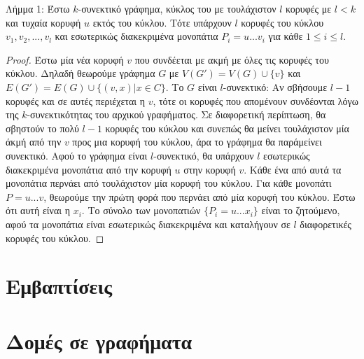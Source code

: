 \documentclass[a4paper, oneside, 11pt]{article}
\begin{document}
\begin{enumerate}
Λήμμα 1: Έστω $k$-συνεκτικό γράφημα, κύκλος του με τουλάχιστον $l$ κορυφές με $l<k$ και τυχαία κορυφή $u$ εκτός του κύκλου. Τότε υπάρχουν $l$ κορυφές του κύκλου $v_1, v_2, ..., v_l$ και 
εσωτερικώς διακεκριμένα μονοπάτια $P_i = u...v_i$ για κάθε $1\leq i\leq l$.
\begin{proof}
Έστω μία νέα κορυφή $v$ που συνδέεται με ακμή με όλες τις κορυφές του κύκλου. Δηλαδή θεωρούμε γράφημα $G$ με $V(G')=V(G)\cup \{v\}$ και $E(G')=E(G)\cup \{(v,x)|x\in C\}$. Το $G$ είναι $l$-συνεκτικό:
Αν σβήσουμε $l-1$ κορυφές και σε αυτές περιέχεται η $v$, τότε οι κορυφές που απομένουν συνδέονται λόγω της $k$-συνεκτικότητας του αρχικού γραφήματος. Σε διαφορετική περίπτωση, θα σβηστούν το πολύ $l-1$
κορυφές του κύκλου και συνεπώς θα μείνει τουλάχιστον μία άκμή από την $v$ προς μια κορυφή του κύκλου, άρα το γράφημα θα παράμείνει συνεκτικό. Αφού το γράφημα είναι $l$-συνεκτικό, θα υπάρχουν $l$ εσωτερικώς
διακεκριμένα μονοπάτια από την κορυφή $u$ στην κορυφή $v$. Κάθε ένα από αυτά τα μονοπάτια περνάει από τουλάχιστον μία κορυφή του κύκλου. Για κάθε μονοπάτι $P = u...v$, θεωρούμε την πρώτη φορά που περνάει
από μία κορυφή του κύκλου. Έστω ότι αυτή είναι η $x_i$. Το σύνολο των μονοπατιών $\{P_i = u...x_i\}$ είναι το ζητούμενο, αφού τα μονοπάτια είναι εσωτερικώς διακεκριμένα και καταλήγουν σε $l$ διαφορετικές
κορυφές του κύκλου.

\end{proof}

\end{enumerate}
\section{Εμβαπτίσεις}
\section{Δομές σε γραφήματα}
\end{document}
